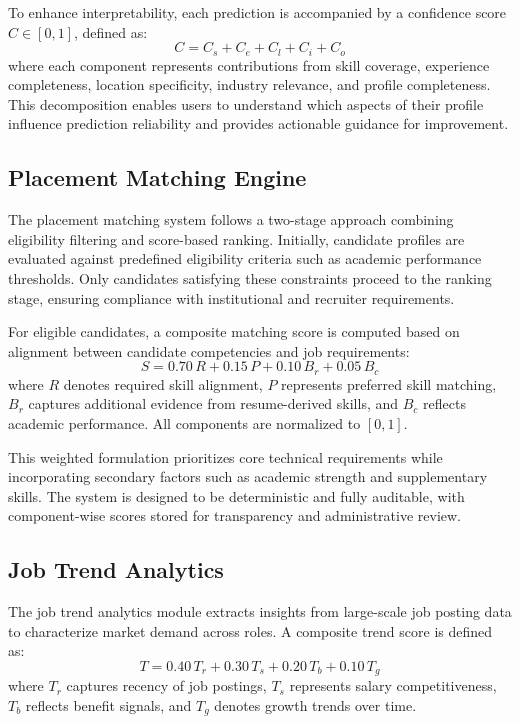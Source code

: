 \documentclass[conference]{IEEEtran}
\begin{document}
To enhance interpretability, each prediction is accompanied by a
confidence score $C \in [0,1]$, defined as:
\begin{equation}
C = C_s + C_e + C_l + C_i + C_o
\end{equation}
where each component represents contributions from skill coverage,
experience completeness, location specificity, industry relevance, and
profile completeness. This decomposition enables users to understand
which aspects of their profile influence prediction reliability and
provides actionable guidance for improvement.

\subsection{Placement Matching Engine}
The placement matching system follows a two-stage approach combining
eligibility filtering and score-based ranking. Initially, candidate
profiles are evaluated against predefined eligibility criteria such as
academic performance thresholds. Only candidates satisfying these
constraints proceed to the ranking stage, ensuring compliance with
institutional and recruiter requirements.

For eligible candidates, a composite matching score is computed based
on alignment between candidate competencies and job requirements:
\begin{equation}
S = 0.70\,R + 0.15\,P + 0.10\,B_r + 0.05\,B_c
\end{equation}
where $R$ denotes required skill alignment, $P$ represents preferred
skill matching, $B_r$ captures additional evidence from resume-derived
skills, and $B_c$ reflects academic performance. All components are
normalized to $[0,1]$.

This weighted formulation prioritizes core technical requirements while
incorporating secondary factors such as academic strength and
supplementary skills. The system is designed to be deterministic and
fully auditable, with component-wise scores stored for transparency and
administrative review.

\subsection{Job Trend Analytics}
The job trend analytics module extracts insights from large-scale job
posting data to characterize market demand across roles. A composite
trend score is defined as:
\begin{equation}
T = 0.40\,T_r + 0.30\,T_s + 0.20\,T_b + 0.10\,T_g
\end{equation}
where $T_r$ captures recency of job postings, $T_s$ represents salary
competitiveness, $T_b$ reflects benefit signals, and $T_g$ denotes
growth trends over time.
\end{document}
